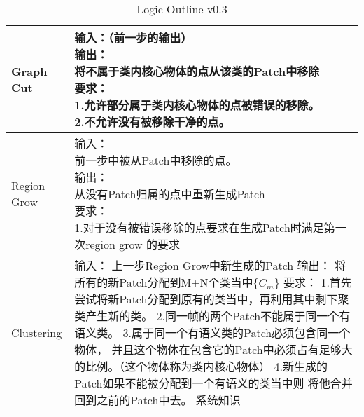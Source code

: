 \begin{table*}[!hbp]
\begin{tabular}{p{}|p{}}
		\hline
		Graph Cut&\tabincell{l}{
			输入：（前一步的输出）\\
			输出：\\
			将不属于类内核心物体的点从该类的Patch中移除\\
			要求：\\
			1.允许部分属于类内核心物体的点被错误的移除。\\
			2.不允许没有被移除干净的点。}\\
		\hline
		Region Grow&\tabincell{l}{
			输入：\\
			前一步中被从Patch中移除的点。\\
			输出：\\
			从没有Patch归属的点中重新生成Patch\\
			要求：\\
			1.对于没有被错误移除的点要求在生成Patch时满足第一次region grow 的要求}\\
		\hline
		Clustering&\tabincell{l}{
			输入：\\
			上一步Region Grow中新生成的Patch\\
			输出：\\
			将所有的新Patch分配到M+N个类当中$\{C_m\}$\\
			要求：\\
			1.首先尝试将新Patch分配到原有的类当中，再利用其中剩下聚类产生新的类。\\
			2.同一帧的两个Patch不能属于同一个有语义类。\\
			3.属于同一个有语义类的Patch必须包含同一个物体，\\并且这个物体在包含它的Patch中必须占有足够大的比例。（这个物体称为类内核心物体）\\
			4.新生成的Patch如果不能被分配到一个有语义的类当中则\\将他合并回到之前的Patch中去。
			系统知识
		}\\
		\hline
	\end{tabular}
	\caption{Logic Outline v0.3} %
	\label{tab:logic_outline03}
\end{table*}